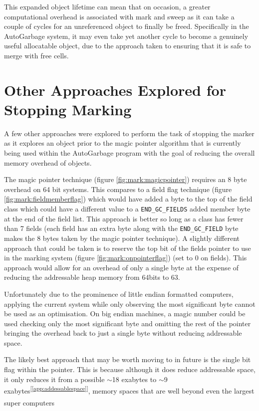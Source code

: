 \documentclass[11pt]{article}
\begin{document}
This expanded object lifetime can mean that on occasion, a greater computational overhead is associated with
mark and sweep as it can take a couple of cycles for an unreferenced object to finally be freed. Specifically in the AutoGarbage
system, it may even take yet another cycle to become a genuinely useful allocatable object, due to the approach taken to ensuring
that it is safe to merge with free cells.

\newpage
\appendix
\section{Other Approaches Explored for Stopping Marking}
\label{app:exploredmarkingapproaches}
A few other approaches were explored to perform the task of stopping the marker as it explores an object prior to the magic
pointer algorithm that is currently being used within the AutoGarbage program with the goal of reducing the overall memory overhead
of objects. 

The magic pointer technique (figure \ref{fig:mark:magicpointer}) requires an 8 byte overhead on 64 bit systems.
This compares to a field flag technique (figure \ref{fig:mark:fieldmemberflag}) which would
have added a byte to the top of the field class which could have a different value to a \texttt{END\_GC\_FIELDS} added member byte 
at the end of the field list. This approach is better so long as a class has fewer than 7 fields (each field has an extra byte 
along with the \texttt{END\_GC\_FIELD} byte makes the 8 bytes taken by the magic pointer technique).
A slightly different approach that could be taken is to reserve the top bit of the fields pointer to use in the marking system (figure \ref{fig:mark:onpointerflag})
(set to 0 on fields). This approach would allow for an overhead of only a single byte at the expense of reducing the addressable 
heap memory from 64bits to 63.

Unfortunately due to the prominence of little endian formatted computers, applying the current system while only observing the most
significant byte cannot be used as an optimisation. On big endian machines, a magic number could be used checking only the most
significant byte and omitting the rest of the pointer bringing the overhead back to just a single byte without reducing
addressable space.

The likely best approach that may be worth moving to in future is the single bit flag within the pointer. This is because although
it does reduce addressable space, it only reduces 
it from a possible $\sim$18 exabytes to $\sim$9 exabytes\textsuperscript{[\ref{app:addessablespace}]},
memory spaces that are well beyond even the largest super computers\textsuperscript{\cite{bib:summitsupercomputer}}
\end{document}
